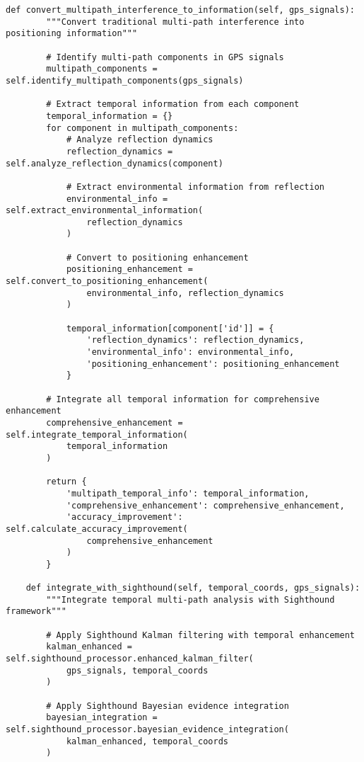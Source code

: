 \documentclass[12pt,a4paper]{article}
\begin{document}
\begin{lstlisting}[style=pythonstyle, caption=Temporal Multi-Path Analysis for GPS Enhancement]
    def convert_multipath_interference_to_information(self, gps_signals):
        """Convert traditional multi-path interference into positioning information"""
        
        # Identify multi-path components in GPS signals
        multipath_components = self.identify_multipath_components(gps_signals)
        
        # Extract temporal information from each component
        temporal_information = {}
        for component in multipath_components:
            # Analyze reflection dynamics
            reflection_dynamics = self.analyze_reflection_dynamics(component)
            
            # Extract environmental information from reflection
            environmental_info = self.extract_environmental_information(
                reflection_dynamics
            )
            
            # Convert to positioning enhancement
            positioning_enhancement = self.convert_to_positioning_enhancement(
                environmental_info, reflection_dynamics
            )
            
            temporal_information[component['id']] = {
                'reflection_dynamics': reflection_dynamics,
                'environmental_info': environmental_info,
                'positioning_enhancement': positioning_enhancement
            }
        
        # Integrate all temporal information for comprehensive enhancement
        comprehensive_enhancement = self.integrate_temporal_information(
            temporal_information
        )
        
        return {
            'multipath_temporal_info': temporal_information,
            'comprehensive_enhancement': comprehensive_enhancement,
            'accuracy_improvement': self.calculate_accuracy_improvement(
                comprehensive_enhancement
            )
        }
    
    def integrate_with_sighthound(self, temporal_coords, gps_signals):
        """Integrate temporal multi-path analysis with Sighthound framework"""
        
        # Apply Sighthound Kalman filtering with temporal enhancement
        kalman_enhanced = self.sighthound_processor.enhanced_kalman_filter(
            gps_signals, temporal_coords
        )
        
        # Apply Sighthound Bayesian evidence integration
        bayesian_integration = self.sighthound_processor.bayesian_evidence_integration(
            kalman_enhanced, temporal_coords
        )
        

\end{lstlisting}
\end{document}
